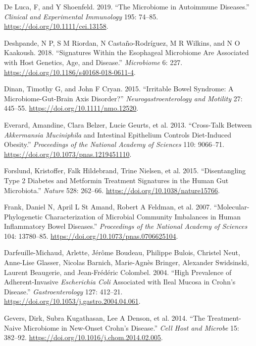 \documentclass[
  11pt,
]{article}
\newlength{\cslhangindent}
\newenvironment{CSLReferences}[2] %
 {\begin{list}{}{%
  \setlength{\itemindent}{0pt}
  \setlength{\leftmargin}{0pt}
  \setlength{\parsep}{0pt}
  \ifodd #1
   \setlength{\leftmargin}{\cslhangindent}
   \setlength{\itemindent}{-1\cslhangindent}
  \fi
  \setlength{\itemsep}{#2\baselineskip}}}
 {\end{list}}
\begin{document}
\begin{CSLReferences}{1}{0}
De Luca, F, and Y Shoenfeld. 2019. {``The Microbiome in Autoimmune
Diseases.''} \emph{Clinical and Experimental Immunology} 195: 74--85.
\url{https://doi.org/10.1111/cei.13158}.

Deshpande, N P, S M Riordan, N Castaño-Rodríguez, M R Wilkins, and N O
Kaakoush. 2018. {``Signatures Within the Esophageal Microbiome Are
Associated with Host Genetics, Age, and Disease.''} \emph{Microbiome} 6:
227. \url{https://doi.org/10.1186/s40168-018-0611-4}.

Dinan, Timothy G, and John F Cryan. 2015. {``Irritable Bowel Syndrome: A
Microbiome-Gut-Brain Axis Disorder?''} \emph{Neurogastroenterology and
Motility} 27: 445--55. \url{https://doi.org/10.1111/nmo.12520}.

Everard, Amandine, Clara Belzer, Lucie Geurts, et al. 2013.
{``Cross-Talk Between \emph{{A}kkermansia Muciniphila} and Intestinal
Epithelium Controls Diet-Induced Obesity.''} \emph{Proceedings of the
National Academy of Sciences} 110: 9066--71.
\url{https://doi.org/10.1073/pnas.1219451110}.

Forslund, Kristoffer, Falk Hildebrand, Trine Nielsen, et al. 2015.
{``Disentangling Type 2 Diabetes and Metformin Treatment Signatures in
the Human Gut Microbiota.''} \emph{Nature} 528: 262--66.
\url{https://doi.org/10.1038/nature15766}.

Frank, Daniel N, April L St Amand, Robert A Feldman, et al. 2007.
{``Molecular-Phylogenetic Characterization of Microbial Community
Imbalances in Human Inflammatory Bowel Diseases.''} \emph{Proceedings of
the National Academy of Sciences} 104: 13780--85.
\url{https://doi.org/10.1073/pnas.0706625104}.

Darfeuille-Michaud, Arlette, Jérôme Boudeau, Philippe Bulois, Christel
Neut, Anne-Lise Glasser, Nicolas Barnich, Marie-Agnès Bringer,
Alexander Swidsinski, Laurent Beaugerie, and Jean-Frédéric Colombel.
2004. {``High Prevalence of Adherent-Invasive \emph{Escherichia Coli}
Associated with Ileal Mucosa in Crohn's Disease.''}
\emph{Gastroenterology} 127: 412--21.
\url{https://doi.org/10.1053/j.gastro.2004.04.061}.

Gevers, Dirk, Subra Kugathasan, Lee A Denson, et al. 2014. {``The
Treatment-Naive Microbiome in New-Onset {C}rohn's Disease.''} \emph{Cell
Host and Microbe} 15: 382--92.
\url{https://doi.org/10.1016/j.chom.2014.02.005}.


\end{CSLReferences}
\end{document}

